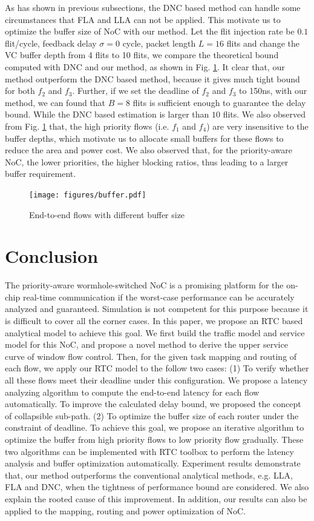 \documentclass[10pt,journal]{IEEEtran}
\begin{document}
As has shown in previous subsections, the DNC based method \cite{Qian489900} can handle some circumstances that FLA and LLA can not be applied. This motivate us to optimize the buffer size of NoC with our method. Let the flit injection rate be $0.1$ flit/cycle, feedback delay $\sigma=0$ cycle, packet length $L=16$ flits and change the VC buffer depth from 4 flits to 10 flits, we compare the theoretical bound computed with DNC and our method, as shown in Fig. \ref{buffer}. It clear that, our method outperform the DNC based method, because it gives much tight bound for both $f_2$ and $f_3$. Further, if we set the deadline of $f_2$ and $f_3$ to 150ns, with our method, we can found that $B=8$ flits is sufficient enough to guarantee the delay bound. While the DNC based estimation is larger than $10$ flits. We also observed from Fig. \ref{buffer} that, the high priority flows (i.e. $f_1$ and $f_4$) are very insensitive to the buffer depths, which motivate us to allocate small buffers for these flows to reduce the area and power cost. We also observed that, for the priority-aware NoC, the lower priorities, the higher blocking ratios, thus leading to a larger buffer requirement.
\begin{figure}
  \centering
  \texttt{[image: figures/buffer.pdf]}\\
  \caption{End-to-end flows with different buffer size}\label{buffer}
\end{figure}

\section{Conclusion}\label{conclusion}
The priority-aware wormhole-switched NoC is a promising platform for the on-chip real-time communication if the worst-case performance can be accurately analyzed and guaranteed. Simulation is not competent for this purpose because it is difficult to cover all the corner cases. In this paper, we propose an RTC based analytical model to achieve this goal. We first build the traffic model and service model for this NoC, and propose a novel method to derive the upper service curve of window flow control. Then, for the given task mapping and routing of each flow, we apply our RTC model to the follow two cases: (1) To verify whether all these flows meet their deadline under this configuration. We propose a latency analyzing algorithm to compute the end-to-end latency for each flow automatically. To improve the calculated delay bound, we proposed the concept of collapsible sub-path. (2) To optimize the buffer size of each router under the constraint of deadline. To achieve this goal, we propose an iterative algorithm to optimize the buffer from high priority flows to low priority flow gradually. These two algorithms can be implemented with RTC toolbox to perform the latency analysis and buffer optimization automatically. Experiment results demonstrate that, our method outperforms the conventional analytical methods, e.g. LLA, FLA and DNC, when the tightness of performance bound are considered. We also explain the rooted cause of this improvement. In addition, our results can also be applied to the mapping, routing and power optimization of NoC.
\end{document}
